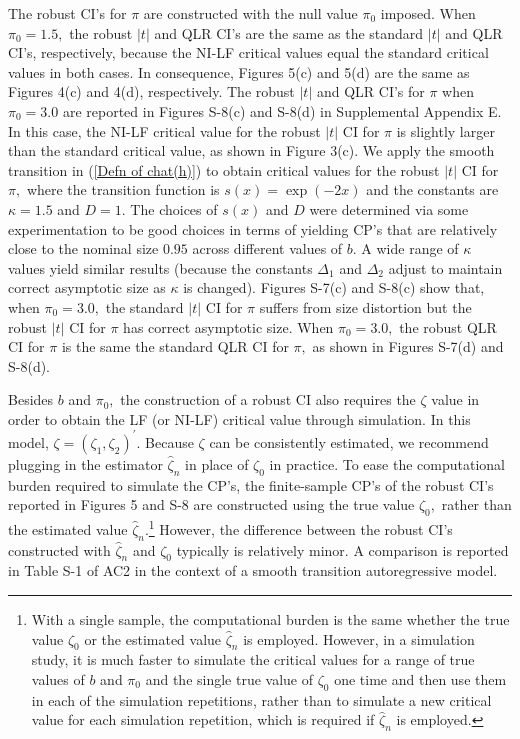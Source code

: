 \documentclass[12pt,titlepage,final,oneside,letterpaper]{article}
\begin{document}
The robust CI's for $\pi $ are constructed with the null value $\pi _{0}$
imposed. When $\pi _{0}=1.5,$ the robust $|t|$ and QLR CI's are the same as
the standard $|t|$ and QLR CI's, respectively, because the NI-LF critical
values equal the standard critical values in both cases. In consequence,
Figures 5(c) and 5(d) are the same as Figures 4(c) and 4(d), respectively.
The robust $|t|$ and QLR CI's for $\pi $ when $\pi _{0}=3.0$ are reported in
Figures S-8(c) and S-8(d) in Supplemental Appendix E. In this case, the
NI-LF critical value for the robust $|t|$ CI for $\pi $ is slightly larger
than the standard critical value, as shown in Figure 3(c). We apply the
smooth transition in (\ref{Defn of chat(h)}) to obtain critical values for
the robust $|t|$ CI for $\pi ,$ where the transition function is $s(x)=\exp
(-2x)$ and the constants are $\kappa =1.5$ and $D=1.$ The choices of $s(x)$
and $D$ were determined via some experimentation to be good choices in terms
of yielding CP's that are relatively close to the nominal size $0.95$ across
different values of $b.$ A wide range of $\kappa $ values yield similar
results (because the constants $\Delta _{1}$ and $\Delta _{2}$ adjust to
maintain correct asymptotic size as $\kappa $ is changed). Figures S-7(c)
and S-8(c) show that, when $\pi _{0}=3.0,$ the standard $|t|$ CI for $\pi $
suffers from size distortion but the robust $|t|$ CI for $\pi $ has correct
asymptotic size. When $\pi _{0}=3.0,$ the robust QLR CI for $\pi $ is the
same the standard QLR CI for $\pi ,$ as shown in Figures S-7(d) and S-8(d).

Besides $b$ and $\pi _{0},$ the construction of a robust CI also requires
the $\zeta $ value in order to obtain the LF (or NI-LF) critical value
through simulation. In this model, $\zeta =(\zeta _{1},\zeta _{2})^{\prime
}. $ Because $\zeta $ can be consistently estimated, we recommend plugging
in the estimator $\widehat{\zeta }_{n}$ in place of $\zeta _{0}$ in
practice. To ease the computational burden required to simulate the CP's,
the finite-sample CP's of the robust CI's reported in Figures 5 and S-8 are
constructed using the true value $\zeta _{0},$ rather than the estimated
value $\widehat{\zeta }_{n}.$\footnote{%
With a single sample, the computational burden is the same whether the true
value $\zeta _{0}$ or the estimated value $\widehat{\zeta }_{n}$ is
employed. However, in a simulation study, it is much faster to simulate the
critical values for a range of true values of $b$ and $\pi _{0}$ and the
single true value of $\zeta _{0}$ one time and then use them in each of the
simulation repetitions, rather than to simulate a new critical value for
each simulation repetition, which is required if $\widehat{\zeta }_{n}$ is
employed.} However, the difference between the robust CI's constructed with $%
\widehat{\zeta }_{n}$ and $\zeta _{0}$ typically is relatively minor. A
comparison is reported in Table S-1 of AC2 in the context of a smooth
transition autoregressive model.
\end{document}
